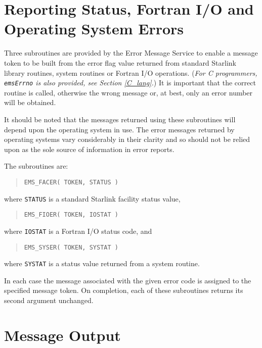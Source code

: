 \documentclass[twoside,11pt]{article}
\newcommand{\xlabel}[1]{}
\renewcommand{\_}{\texttt{\symbol{95}}}
\begin{document}
\section{\xlabel{reporting_status_fortran_io_and_operating_system_errors}Reporting
Status, Fortran I/O and Operating System Errors}\label{Stat_sect}
Three subroutines are provided by the Error Message Service to enable a message
token to be built from the error flag value returned from standard Starlink 
library routines, system routines or Fortran I/O operations. (\emph{For C
programmers, \texttt{emsErrno} is also provided, see Section \ref{C_lang}.})
It is important that the correct routine is called, otherwise the wrong 
message or, at best, only an error number will be obtained.

It should be noted that the messages returned using these subroutines 
will depend upon the operating system in use.
The error messages returned by operating systems vary considerably in their
clarity and so should not be relied upon as the sole source of information
in error reports.

The subroutines are:
\begin {quote}
\begin{verbatim}
EMS_FACER( TOKEN, STATUS )
\end{verbatim}
\end {quote}
where \texttt{STATUS} is a standard Starlink facility status value,
\begin {quote}
\begin{verbatim}
EMS_FIOER( TOKEN, IOSTAT )
\end{verbatim}
\end {quote}
where \texttt{IOSTAT} is a Fortran I/O status code, and
\begin {quote}
\begin{verbatim}
EMS_SYSER( TOKEN, SYSTAT )
\end{verbatim}
\end {quote}
where \texttt{SYSTAT} is a status value returned from a system routine. 

In each case the message associated with the given error code is assigned to
the specified message token. 
On completion, each of these subroutines returns its second argument
unchanged. 

\section{\xlabel{message_output}Message Output}
\end{document}

